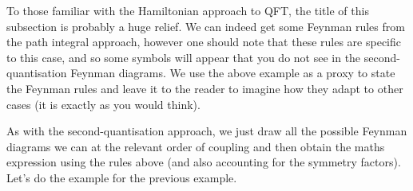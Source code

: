 To those familiar with the Hamiltonian approach to QFT, the title of this subsection is probably a huge relief. We can indeed get some Feynman rules from the path integral approach, however one should note that these rules are specific to this case, and so some symbols will appear that you do not see in the second-quantisation Feynman diagrams. We use the above example as a proxy to state the Feynman rules and leave it to the reader to imagine how they adapt to other cases (it is exactly as you would think). 


As with the second-quantisation approach, we just draw all the possible Feynman diagrams we can at the relevant order of coupling and then obtain the maths expression using the rules above (and also accounting for the symmetry factors). Let's do the example for the previous example. 

